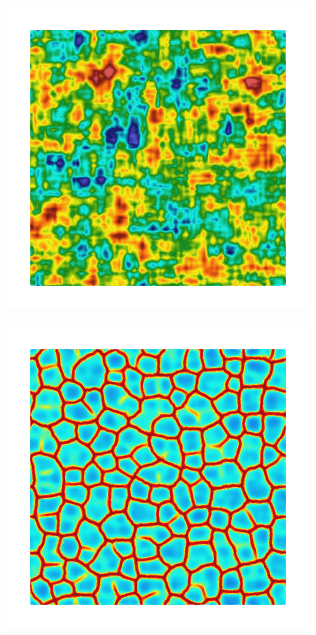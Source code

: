\begin{figure}[!htb]
\begin{subfigure}[b]{0.15\textwidth}
    \caption{}
    \label{fig: Chapter4/2D/Gc_exp_cartesian_5_5_rho_0_seed_c}
  \end{subfigure}
  \begin{subfigure}[b]{0.15\textwidth}
    \includegraphics[width=\textwidth]{Chapter4/figures/2D/psic_exp_cartesian_5_5_rho_0_seed_c.png}
    \caption{}
    \label{fig: Chapter4/2D/psic_exp_cartesian_5_5_rho_0_seed_c}
  \end{subfigure}
  \begin{subfigure}[b]{0.15\textwidth}
    \includegraphics[width=\textwidth]{Chapter4/figures/2D/d_exp_cartesian_5_5_rho_0_seed_c.png}
    \caption{}
    \label{fig: Chapter4/2D/d_exp_cartesian_5_5_rho_0_seed_c}
  \end{subfigure}


\end{figure}
